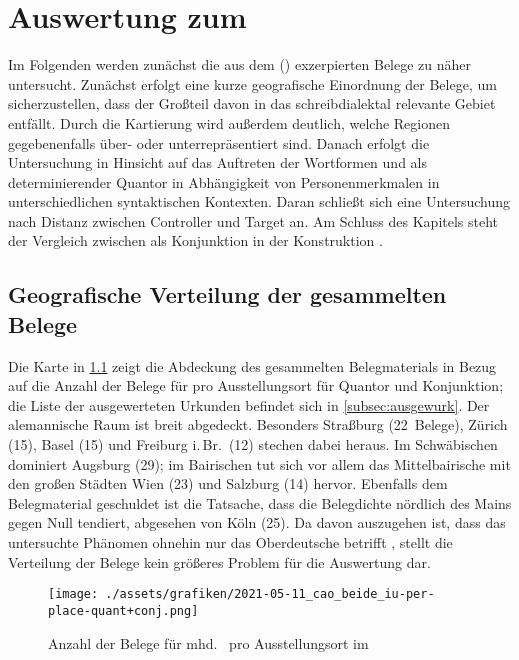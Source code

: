 \chapter{Auswertung zum }
\label{ch:caoanalyse}

Im Folgenden werden zunächst die aus dem  (\CAO{})
exzerpierten Belege zu  näher untersucht. Zunächst erfolgt eine
kurze geografische Einordnung der Belege, um sicherzustellen, dass der Großteil
davon in das schreib\-dialektal relevante Gebiet entfällt. Durch die Kartierung
wird außerdem deutlich, welche Regionen gegebenenfalls über- oder
unter\-repräsentiert sind. Danach erfolgt die Untersuchung in Hinsicht auf das
Auftreten der Wortformen  und  als determinierender
Quantor in Abhängigkeit von Personenmerkmalen in unterschiedlichen
syntaktischen Kontexten. Daran schließt sich eine Untersuchung nach Distanz
zwischen Controller und Target an. Am Schluss des Kapitels steht der Vergleich
zwischen  als Konjunk\-tion in der Konstruktion
 .

\section{Geografische Verteilung der gesammelten Belege}

Die Karte in \cref{fig:beidemapcao} zeigt die Abdeckung des gesammelten
Belegmaterials in Bezug auf die Anzahl der Belege für  pro
Ausstellungsort für Quantor und Konjunktion; die Liste der ausgewerteten
Urkunden befindet sich in \cref{subsec:ausgewurk}. Der alemannische Raum ist
breit abgedeckt. Besonders Straßburg (22~Belege), Zürich (15), Basel (15) und
Freiburg i.\,Br.\ (12) stechen dabei heraus. Im Schwäbischen dominiert Augsburg
(29); im Bairischen tut sich vor allem das Mittelbairische mit den großen
Städten Wien (23) und Salzburg (14) hervor. Ebenfalls dem Belegmaterial
geschuldet ist die Tatsache, dass die Belegdichte nördlich des Mains gegen Null
tendiert, abgesehen von Köln (25). Da davon auszugehen ist, dass das
untersuchte Phänomen ohnehin nur das Oberdeutsche betrifft
\autocite[181--184]{ksw2}, stellt die Verteilung der Belege kein größeres
Problem für die Auswertung dar.

\begin{figure}
\centering
\texttt{[image: ./assets/grafiken/2021-05-11\_cao\_beide\_iu-per-place-quant+conj.png]}
\caption{Anzahl der Belege für mhd.\  pro Ausstellungs\-ort
im \CAO{}\nocite{wiesinger1983:rede}}
\label{fig:beidemapcao}
\end{figure}

